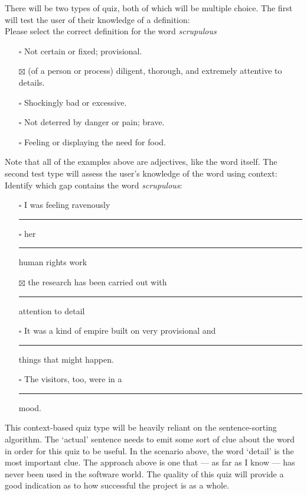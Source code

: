 There will be two types of quiz, both of which will be multiple choice. The first will test the user of their knowledge of a definition: \\

Please select the correct definition for the word \emph{scrupulous}

\begin{itemize}
\item[$\square$] Not certain or fixed; provisional.
\item[$\boxtimes$] (of a person or process) diligent, thorough, and extremely attentive to details.
\item[$\square$] Shockingly bad or excessive.
\item[$\square$] Not deterred by danger or pain; brave.
\item[$\square$] Feeling or displaying the need for food.
\end{itemize}

Note that all of the examples above are adjectives, like the word itself. The second test type will assess the user's knowledge of the word using context:\\

Identify which gap contains the word \emph{scrupulous}:

\begin{itemize}
\item[$\square$] I was feeling ravenously \rule{2cm}{0.02cm}
\item[$\square$] her \rule{2cm}{0.02cm} human rights work
\item[$\boxtimes$] the research has been carried out with \rule{2cm}{0.02cm} attention to detail
\item[$\square$] It was a kind of empire built on very provisional and \rule{2cm}{0.02cm} things that might happen.
\item[$\square$] The visitors, too, were in a \rule{2cm}{0.02cm} mood.
\end{itemize}

This context-based quiz type will be heavily reliant on the sentence-sorting algorithm. The `actual' sentence needs to emit some sort of clue about the word in order for this quiz to be useful. In the scenario above, the word `detail' is the most important clue.  The approach above is one that --- as far as I know --- has never been used in the software world. The quality of this quiz will provide a good indication as to how successful the project is as a whole. \\

